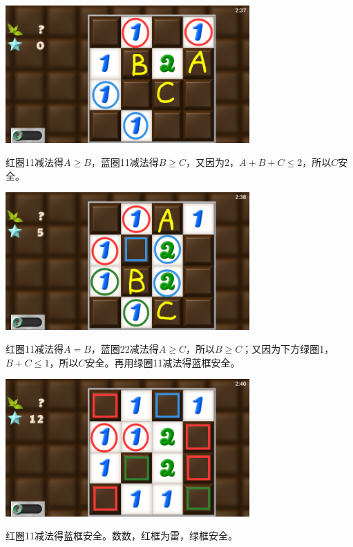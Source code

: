 \subsection{} %
\begin{center}
    \includegraphics[width=0.7\textwidth]{puzzle/150-1.png}
\end{center}
红圈11减法得$A\ge B$，蓝圈11减法得$B\ge C$，又因为2，$A+B+C\le 2$，所以$C$安全。
\begin{center}
    \includegraphics[width=0.7\textwidth]{puzzle/150-2.png}
\end{center}
红圈11减法得$A=B$，蓝圈22减法得$A\ge C$，所以$B\ge C$；又因为下方绿圈1，$B+C\le 1$，所以$C$安全。再用绿圈11减法得蓝框安全。
\begin{center}
    \includegraphics[width=0.7\textwidth]{puzzle/150-3.png}
\end{center}
红圈11减法得蓝框安全。数数，红框为雷，绿框安全。

